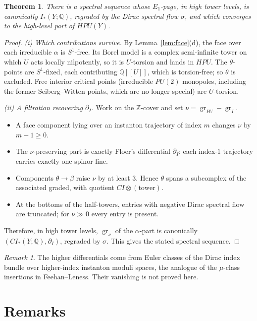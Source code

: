 \documentclass[11pt]{amsart}
\newtheorem{theorem}{Theorem}
\theoremstyle{definition}
\theoremstyle{remark}
\newtheorem{remark}{Remark}
\newcommand{\Z}{\mathbb{Z}}
\newcommand{\Q}{\mathbb{Q}}
\newcommand{\HPU}{\mathit{HPU}}
\DeclareMathOperator{\gr}{gr}
\begin{document}
\begin{theorem}\label{thm:B}
There is a spectral sequence whose $E_1$-page, in high tower levels, is
canonically $I_*(Y;\Q)$, regraded by the Dirac spectral flow $\sigma$, and
which converges to the high-level part of $\HPU(Y)$.
\end{theorem}

\begin{proof}
\emph{(i) Which contributions survive.} By Lemma~\ref{lem:face}(d), the
face over each irreducible $\alpha$ is $S^1$-free. Its Borel model is a
complex semi-infinite tower on which $U$ acts locally nilpotently, so it
is $U$-torsion and lands in $\HPU$. The $\theta$-points are $S^1$-fixed,
each contributing $\Q[[U]]$, which is torsion-free; so $\theta$ is
excluded. Free interior critical points (irreducible $PU(2)$ monopoles,
including the former Seiberg--Witten points, which are no longer special)
are $U$-torsion.

\emph{(ii) A filtration recovering $\partial_I$.} Work on the $\Z$-cover
and set $\nu=\gr_{PU}-\gr_I$.
\begin{itemize}[leftmargin=*]
\item A face component lying over an instanton trajectory of index $m$
  changes $\nu$ by $m-1\ge0$.
\item The $\nu$-preserving part is exactly Floer's differential
  $\partial_I$: each index-$1$ trajectory carries exactly one spinor line.
\item Components $\theta\to\beta$ raise $\nu$ by at least $3$. Hence
  $\theta$ spans a subcomplex of the associated graded, with quotient
  $CI\otimes(\text{tower})$.
\item At the bottoms of the half-towers, entries with negative Dirac
  spectral flow are truncated; for $\nu\gg0$ every entry is present.
\end{itemize}
Therefore, in high tower levels, $\gr_\nu$ of the $\alpha$-part is
canonically $(CI_*(Y;\Q),\partial_I)$, regraded by $\sigma$. This gives
the stated spectral sequence.
\end{proof}

\begin{remark}
The higher differentials come from Euler classes of the Dirac index
bundle over higher-index instanton moduli spaces, the analogue of the
$\mu$-class insertions in Feehan--Leness. Their vanishing is not proved
here.
\end{remark}

\section{Remarks}
\end{document}
